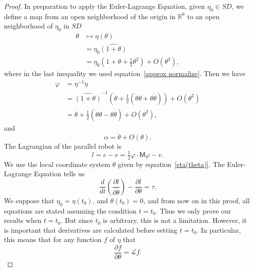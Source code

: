 \documentclass[reqno,12pt]{amsart}
\newcommand\setunitdualquat{SD}
\newcommand{\liederiv}{\mathcal L}
\begin{document}
\begin{proof}  In preparation to apply the Euler-Lagrange Equation, given $\eta_0 \in \setunitdualquat$, we define a map from an open neighborhood of the origin in $\mathbb R^6$ to an open neighborhood of $\eta_0$ in $\setunitdualquat$
\begin{equation}
\label{eta(theta)}
\begin{aligned}
\theta &\mapsto \eta(\theta) \\
&= \eta_0 \widehat{(1+\theta)} \\
&= \eta_0 (1 + \theta + \tfrac12 \theta^2) + O(\theta^3),
\end{aligned}
\end{equation}
where in the last inequality we used equation~\eqref{approx normalize}.  Then we have
\begin{equation}
\label{dot theta}
\begin{aligned}
\varphi &= \eta^{-1} \dot\eta \\
&= \widehat{(1+\theta)}^{-1} (\dot \theta + \tfrac12(\dot\theta\theta + \theta\dot\theta)) + O(\theta^2) \\
&= \dot\theta + \tfrac12(\dot\theta\theta - \theta\dot\theta) + O(\theta^2) ,
\end{aligned}
\end{equation}
and
\begin{equation}
\label{ddot theta}
\alpha = \ddot\theta + O(\theta) .
\end{equation}
The Lagrangian of the parallel robot is
\begin{equation}
l = e - v = \tfrac12 \varphi \cdot \mathsf M \varphi - v.
\end{equation}
We use the local coordinate system $\theta$ given by equation~\eqref{eta(theta)}.  The Euler-Lagrange Equation \cite{arnold,goldstein-et-al} tells us
\begin{equation}
\label{e-l}
\frac d{dt}\left(\frac{\partial l}{\partial \dot\theta}\right) - \frac{\partial l}{\partial \theta} = \tau.
\end{equation}
We suppose that $\eta_0 = \eta(t_0)$, and $\theta(t_0) = 0$, and from now on in this proof, all equations are stated assuming the condition $t = t_0$.  Thus we only prove our results when $t = t_0$.  But since $t_0$ is arbitrary, this is not a limitation.  However, it is important that derivatives are calculated before setting $t = t_0$.  In particular, this means that for any function $f$ of $\eta$ that
\begin{equation}
\frac{\partial f}{\partial \theta} = \liederiv f.
\end{equation}


\end{proof}
\end{document}

